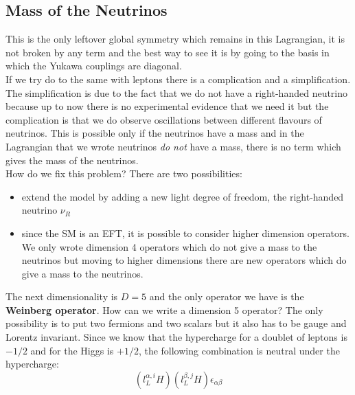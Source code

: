 \documentclass[../main.tex]{subfiles}
\begin{document}
\subsection{Mass of the Neutrinos}
This is the only leftover global symmetry which remains in this Lagrangian, it is not broken by any term and the best way to see it is by going to the basis in which the Yukawa couplings are diagonal.\\
If we try do to the same with leptons there is a complication and a simplification. The simplification is due to the fact that we do not have a right-handed neutrino because up to now there is no experimental evidence that we need it but the complication is that we do observe oscillations between different flavours of neutrinos. This is possible only if the neutrinos have a mass and in the Lagrangian that we wrote neutrinos \textit{do not} have a mass, there is no term which gives the mass of the neutrinos.\\
How do we fix this problem? There are two possibilities:
\begin{itemize}
    \item extend the model by adding a new light degree of freedom, the right-handed neutrino $\nu_R$
    \item since the SM is an EFT, it is possible to consider higher dimension operators. We only wrote dimension 4 operators which do not give a mass to the neutrinos but moving to higher dimensions there are new operators which do give a mass to the neutrinos.
\end{itemize}
The next dimensionality is $D=5$ and the only operator we have is the \textbf{Weinberg operator}. How can we write a dimension 5 operator? The only possibility is to put two fermions and two scalars but it also has to be gauge and Lorentz invariant. Since we know that the hypercharge for a doublet of leptons is $-1/2$ and for the Higgs is $+1/2$, the following combination is neutral under the hypercharge:
\[
(l_L^{\alpha,i} H)(l_L^{\beta,j} H)\epsilon_{\alpha\beta}
\]
\end{document}
